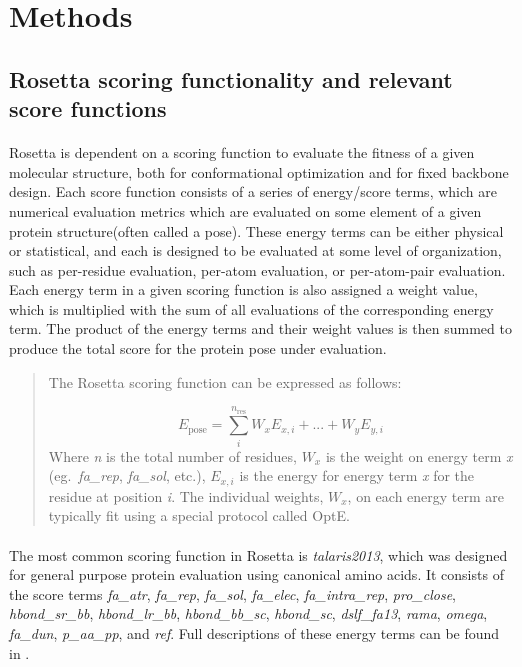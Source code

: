 \section{Methods}

\subsection{Rosetta scoring functionality and relevant score functions}
\paragraph{}
Rosetta is dependent on a scoring function to evaluate the fitness of a given molecular structure, both for conformational optimization and for fixed backbone design.
Each score function consists of a series of energy/score terms, which are numerical evaluation metrics which are evaluated on some element of a given protein structure(often called a pose).
These energy terms can be either physical or statistical, and each is designed to be evaluated at some level of organization, such as per-residue evaluation, per-atom evaluation, or per-atom-pair evaluation.
Each energy term in a given scoring function is also assigned a weight value, which is multiplied with the sum of all evaluations of the corresponding energy term.
The product of the energy terms and their weight values is then summed to produce the total score for the protein pose under evaluation.

\begin{quote} 
The Rosetta scoring function can be expressed as follows:

\begin{equation}
E_{\text{pose}} = \sum_{i}^{n_{\text{res}}} W_{x} E_{x,i} + ... + W_{y} E_{y,i}
\end{equation}
Where \textit{n} is the total number of residues, $W_{x}$ is the weight on energy term \textit{x} (eg.\ \textit{fa\_rep}, \textit{fa\_sol}, etc.), $E_{x,i}$ is the energy for energy term \textit{x} for the residue at position \textit{i}. 
The individual weights, $W_x$, on each energy term are typically fit using a special protocol called OptE\cite{leaver-fay_chapter_2013}.
\end{quote}

\paragraph{}
The most common scoring function in Rosetta is \textit{talaris2013}, which was designed for general purpose protein evaluation using canonical amino acids\cite{leaver-fay_chapter_2013}.
It consists of the score terms \textit{fa\_atr}, \textit{fa\_rep}, \textit{fa\_sol}, \textit{fa\_elec}, \textit{fa\_intra\_rep}, \textit{pro\_close}, \textit{hbond\_sr\_bb}, \textit{hbond\_lr\_bb}, \textit{hbond\_bb\_sc}, \textit{hbond\_sc}, \textit{dslf\_fa13}, \textit{rama}, \textit{omega}, \textit{fa\_dun}, \textit{p\_aa\_pp}, and \textit{ref}.
Full descriptions of these energy terms can be found in \cite{leaver-fay_chapter_2013}.

